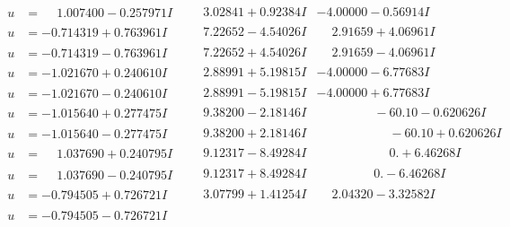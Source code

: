 \documentclass[1p]{elsarticle_modified}
\theoremstyle{definition}
\begin{document}
$$\begin{array}{c|c|c}
\begin{aligned}
u &= \phantom{-}1.007400 - 0.257971 I\end{aligned}
 & \phantom{-}3.02841 + 0.92384 I & -4.00000 - 0.56914 I \\ \hline\begin{aligned}
u &= -0.714319 + 0.763961 I\end{aligned}
 & \phantom{-}7.22652 - 4.54026 I & \phantom{-}2.91659 + 4.06961 I \\ \hline\begin{aligned}
u &= -0.714319 - 0.763961 I\end{aligned}
 & \phantom{-}7.22652 + 4.54026 I & \phantom{-}2.91659 - 4.06961 I \\ \hline\begin{aligned}
u &= -1.021670 + 0.240610 I\end{aligned}
 & \phantom{-}2.88991 + 5.19815 I & -4.00000 - 6.77683 I \\ \hline\begin{aligned}
u &= -1.021670 - 0.240610 I\end{aligned}
 & \phantom{-}2.88991 - 5.19815 I & -4.00000 + 6.77683 I \\ \hline\begin{aligned}
u &= -1.015640 + 0.277475 I\end{aligned}
 & \phantom{-}9.38200 - 2.18146 I & \phantom{-0.000000 }      -6
0. 10   - 0.620626 I \\ \hline\begin{aligned}
u &= -1.015640 - 0.277475 I\end{aligned}
 & \phantom{-}9.38200 + 2.18146 I & \phantom{-0.000000 -}     -6
0. 10   + 0.620626 I \\ \hline\begin{aligned}
u &= \phantom{-}1.037690 + 0.240795 I\end{aligned}
 & \phantom{-}9.12317 - 8.49284 I & \phantom{-0.000000 -}0. + 6.46268 I \\ \hline\begin{aligned}
u &= \phantom{-}1.037690 - 0.240795 I\end{aligned}
 & \phantom{-}9.12317 + 8.49284 I & \phantom{-0.000000 } 0. - 6.46268 I \\ \hline\begin{aligned}
u &= -0.794505 + 0.726721 I\end{aligned}
 & \phantom{-}3.07799 + 1.41254 I & \phantom{-}2.04320 - 3.32582 I \\ \hline\begin{aligned}
u &= -0.794505 - 0.726721 I\end{aligned}

\end{array}$$
\end{document}
